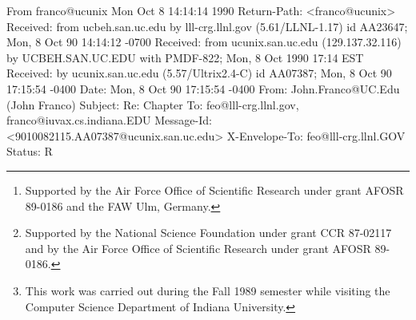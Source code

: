 \author{John Franco,\thanks{
                Supported by the Air Force Office of
                Scientific Research under grant AFOSR 89-0186 and
                the FAW Ulm, Germany.
                }
        \\
        Department of Computer Science \\
        University of Cincinnati \\
        Mail Location 8 \\
        Cincinnati, OH 45221 \\
        \\
        Daniel P. Friedman\thanks{
                Supported by the National Science Foundation under
                grant CCR 87-02117 and by the Air Force Office of
                Scientific Research under grant AFOSR 89-0186.
                }
        \\
        Department of Computer Science \\
        Indiana University \\
        Bloomington, IN 47405 \\
	\\
	Olivier Danvy,\thanks{This work was carried out during the
                Fall 1989 semester while visiting the Computer
                Science Department of Indiana University.
                }
        \\
        Department of Computing and Information Sciences \\
        Kansas State University \\
        Manhattan, KS 66506 \\
}

\date{\ }




\maketitle













From franco@ucunix Mon Oct  8 14:14:14 1990
Return-Path: <franco@ucunix>
Received: from ucbeh.san.uc.edu by lll-crg.llnl.gov (5.61/LLNL-1.17)
	id AA23647; Mon, 8 Oct 90 14:14:12 -0700
Received: from ucunix.san.uc.edu (129.137.32.116) by UCBEH.SAN.UC.EDU with
 PMDF-822; Mon, 8 Oct 1990 17:14 EST
Received: by ucunix.san.uc.edu (5.57/Ultrix2.4-C) id AA07387; Mon, 8 Oct 90
 17:15:54 -0400
Date: Mon, 8 Oct 90 17:15:54 -0400
From: John.Franco@UC.Edu (John Franco)
Subject: Re:  Chapter
To: feo@lll-crg.llnl.gov, franco@iuvax.cs.indiana.EDU
Message-Id: <9010082115.AA07387@ucunix.san.uc.edu>
X-Envelope-To: feo@lll-crg.llnl.GOV
Status: R

